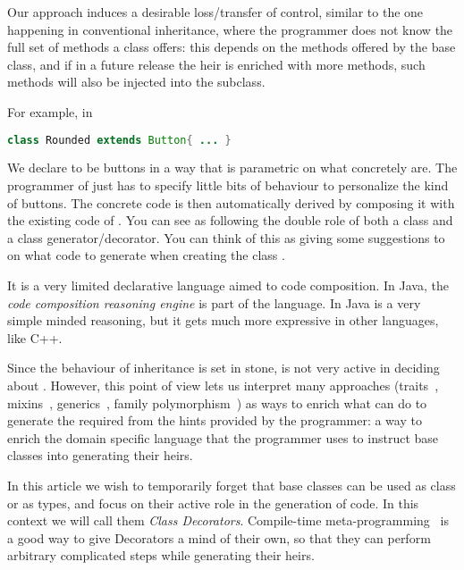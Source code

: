 Our approach
induces a desirable loss/transfer of control,
similar to the one happening in conventional inheritance, where
the programmer does not know the full set of methods a class offers:
this depends on the methods offered by the base class,
and if in a future release the heir is enriched with
more methods, such methods will also be injected into
the subclass.

For example, in

\begin{lstlisting}[language=Java]
class Rounded extends Button{ ... }
\end{lstlisting}

We declare \Q@Rounded@s to be buttons in a way that
is parametric on what \Q@Button@s concretely are.
The programmer of \Q@Rounded@ just has to specify little bits
of behaviour to personalize the kind of buttons.
The concrete code is then automatically derived
by composing it with the existing code of \Q@Button@.
You can see \Q@Button@s as
following the double role of both a class and a class generator/decorator.
You can think of this as giving some suggestions to \Q@Button@
on what code to generate when creating the class \Q@Rounded@.

It is a very limited declarative language aimed to code composition.
In Java,  the \emph{code composition reasoning engine} is part of the language.
In Java is a very simple minded reasoning, but it gets much more expressive in other languages, like C++.

Since the behaviour of inheritance
is set in stone, \Q@Button@ is not very active in deciding
about \Q@Rounded@.
However, this point of view lets us interpret many approaches
(traits~\cite{scharli2003traits}, mixins~\cite{smaragdakis2000mixin}, generics~\cite{igarashi2001featherweight}, family polymorphism~\cite{ernst2001family})
as ways to enrich what \Q@Button@ can do to generate the
required \Q@Rounded@ from the hints provided by the programmer:
a way to enrich the domain specific language
that the programmer uses to instruct base classes into generating their heirs.

In this article we wish to temporarily forget that base classes can be used as class or as types, and
focus on their active role in the generation
of code. In this context we will call them \emph{Class Decorators}.
Compile-time meta-programming~\cite{sheard2002template} is a good way to give Decorators
a mind of their own, so that they can perform arbitrary
complicated steps while generating their heirs.



